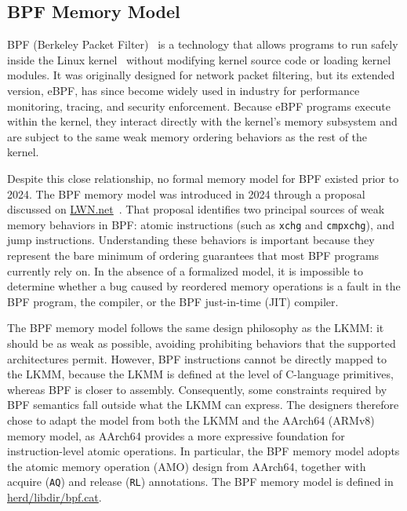 \subsection{BPF Memory Model}
\label{Background:BPF}

BPF (Berkeley Packet Filter)~\citep{mccanne1993bpf} is a technology that allows programs to run safely inside the Linux kernel~\citep{linux-kernel} without modifying kernel source code or loading kernel modules. It was originally designed for network packet filtering, but its extended version, eBPF, has since become widely used in industry for performance monitoring, tracing, and security enforcement. Because eBPF programs execute within the kernel, they interact directly with the kernel's memory subsystem and are subject to the same weak memory ordering behaviors as the rest of the kernel.

Despite this close relationship, no formal memory model for BPF existed prior to 2024. The BPF memory model was introduced in 2024 through a proposal discussed on \href{https://lwn.net/Articles/976071/}{LWN.net}~\citep{bpf-memory-model-lwn}. That proposal identifies two principal sources of weak memory behaviors in BPF: atomic instructions (such as \texttt{xchg} and \texttt{cmpxchg}), and jump instructions. Understanding these behaviors is important because they represent the bare minimum of ordering guarantees that most BPF programs currently rely on. In the absence of a formalized model, it is impossible to determine whether a bug caused by reordered memory operations is a fault in the BPF program, the compiler, or the BPF just-in-time (JIT) compiler.

The BPF memory model follows the same design philosophy as the LKMM: it should be as weak as possible, avoiding prohibiting behaviors that the supported architectures permit. However, BPF instructions cannot be directly mapped to the LKMM, because the LKMM is defined at the level of C-language primitives, whereas BPF is closer to assembly. Consequently, some constraints required by BPF semantics fall outside what the LKMM can express. The designers therefore chose to adapt the model from both the LKMM and the AArch64 (ARMv8) memory model, as AArch64 provides a more expressive foundation for instruction-level atomic operations. In particular, the BPF memory model adopts the atomic memory operation (AMO) design from AArch64, together with acquire (\texttt{AQ}) and release (\texttt{RL}) annotations. The BPF memory model is defined in \href{https://github.com/herd/herdtools7/blob/master/herd/libdir/bpf.cat}{herd/libdir/bpf.cat}.

